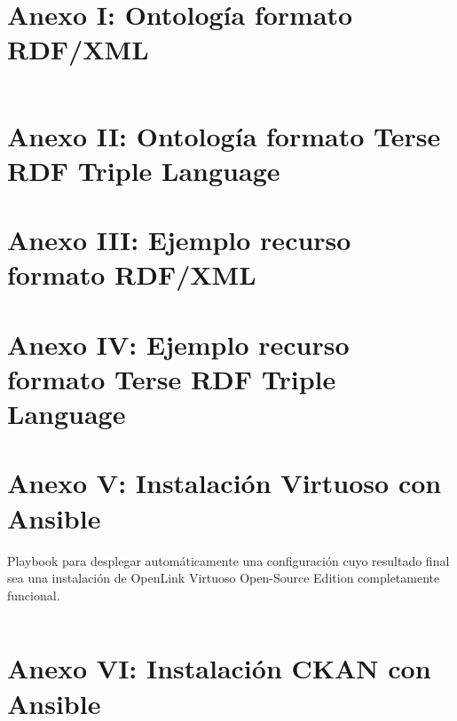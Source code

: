 \chapter*{Anexo I: Ontología formato RDF/XML}

\label{anexo_i}
\inputminted[tabsize=2,breaklines]{xml}{../../data/rdf/rdf/ugr.rdf}

\chapter*{Anexo II: Ontología formato Terse RDF Triple Language}

\chapter*{Anexo III: Ejemplo recurso formato RDF/XML}

\chapter*{Anexo IV: Ejemplo recurso formato Terse RDF Triple Language}

\chapter*{Anexo V: Instalación Virtuoso con Ansible}

{\sf Playbook} para desplegar automáticamente una configuración cuyo resultado final sea una instalación de {\sf OpenLink Virtuoso Open-Source Edition} completamente funcional.

\label{anexo_v}
\inputminted[tabsize=2,breaklines]{yaml}{../../ansible/virtuoso.yml}

\chapter*{Anexo VI: Instalación CKAN con Ansible}
